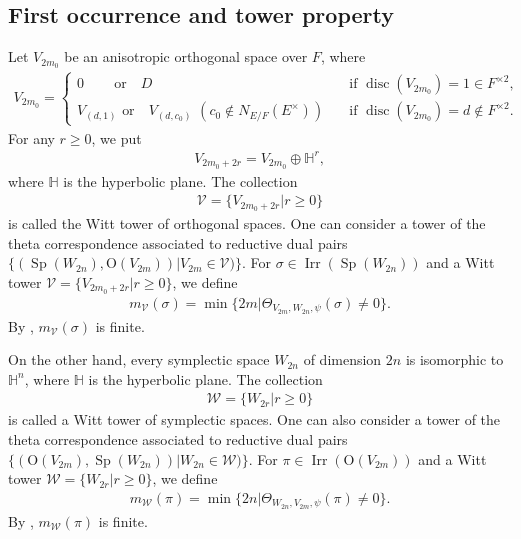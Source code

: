 \documentclass[article]{article}
\numberwithin{equation}{section}
\theoremstyle{definition}
\DeclareMathOperator{\SP}{Sp}
\DeclareMathOperator{\Irr}{Irr}
\DeclareMathOperator{\disc}{disc}
\begin{document}
\subsection{First occurrence and tower property}
Let $V_{2m_0}$ be an anisotropic orthogonal space over $F$, where
\begin{align*}
V_{2m_0}= \begin{cases*}
0\quad\quad\,\mbox{or}\quad D \quad &\mbox{if $\disc(V_{2m_0})=1\in F^{\times 2}$},\\
V_{(d,1)}\,\, \mbox{or}\quad  V_{(d,c_0)}\,\,( c_0\notin N_{E/F}(E^\times))\quad & \mbox{if $\disc(V_{2m_0})=d\notin  F^{\times 2}$}. 
\end{cases*}
\end{align*}
For any $r\geq 0$, we put 
\begin{align*}
V_{2m_0+2r}=V_{2m_0}\oplus \mathbb H^r,
\end{align*}
where $\mathbb H$ is the hyperbolic plane. The collection 
\begin{align*}
\mathcal V=\{V_{2m_0+2r}|r\geq 0\}
\end{align*} 
is called the Witt tower of orthogonal spaces. One can consider a tower of the theta correspondence associated to reductive dual pairs $\{(\SP(W_{2n}),\mathrm O(V_{2m}))|V_{2m}\in \mathcal V)\}$. For $\sigma \in \Irr(\SP(W_{2n}))$ and a Witt tower 
$\mathcal V=\{V_{2m_0+2r}|r\geq 0\}$, we define  
\begin{align}\label{09}
m_{\mathcal V}(\sigma)=\min \{2m |\Theta_{V_{2m},W_{2n},\psi}(\sigma)\neq 0\}. 
\end{align}
By \cite[P.67]{MR1041060}, $m_{\mathcal V}(\sigma)$ is finite. 


On the other hand, every symplectic space $W_{2n}$ of dimension $2n$ is isomorphic to $\mathbb H^n$, where $\mathbb H$ is the hyperbolic plane. The collection 
\begin{align*}
\mathcal W=\{W_{2r}|r\geq 0\}
\end{align*}
is called a Witt tower of symplectic spaces. One can also consider a tower of the theta correspondence associated to reductive dual pairs $\{(\mathrm O(V_{2m}),\SP(W_{2n}))|W_{2n}\in \mathcal W)\}$. For $\pi\in \Irr(\mathrm O(V_{2m}))$ and a Witt tower $\mathcal W=\{W_{2r}|r\geq 0\}$, we define 
\begin{align}\label{10}
m_{\mathcal W}(\pi)=\min \{2n |\Theta_{W_{2n},V_{2m},\psi}(\pi)\neq 0\}. 
\end{align}
By \cite[P.67]{MR1041060}, $m_{\mathcal W}(\pi)$ is finite.
\end{document}
